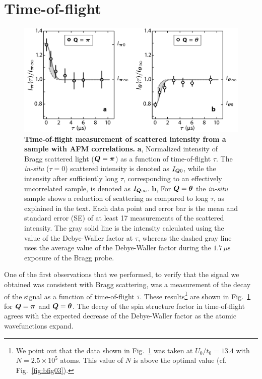 \section{Time-of-flight}
 
\begin{figure}
\centering\includegraphics[width=0.8\columnwidth]{../figures/afmpaper/Hulet_fig2.png}
%
\caption{\textbf{Time-of-flight measurement of scattered intensity from a
sample with AFM correlations.}
\textbf{a}, Normalized intensity of Bragg scattered light
($\bm{Q}=\bm{\pi}$) as a function of time-of-flight $\tau$.  The
\textit{in-situ} ($\tau=0$) scattered intensity is denoted as $I_{\bm{Q}0}$,
while the intensity after sufficiently long $\tau$, corresponding to an
effectively uncorrelated sample, is denoted as $I_{\bm{Q}\infty}$.
\textbf{b}, For $\bm{Q}=\bm{\theta}$  the \textit{in-situ}  sample shows
a reduction of scattering as compared to long $\tau$, as explained in the text.
Each data point and error bar is the mean and standard error (SE) of at least
17 measurements of the scattered intensity.  The gray solid line is the
intensity calculated using the value of the Debye-Waller factor at $\tau$,
whereas the dashed gray line uses the average value of the Debye-Waller factor
during the $1.7\,\mu\text{s}$ exposure of the Bragg probe.}
\label{fig:bfig2}	
\end{figure}

One of the first observations that we performed, to verify that the signal we
obtained was consistent with Bragg scattering, was a measurement of the decay
of the signal as a function of time-of-flight $\tau$.  These
results\footnote{We point out that the data shown in Fig.~\ref{fig:bfig2} was
taken at $U_{0}/t_{0}=13.4$ with $N=2.5\times10^{5}$ atoms. This value of $N$
is above the optimal value (cf. Fig.~\ref{fig:bfig03}).}  are shown in
Fig.~\ref{fig:bfig2} for $\bm{Q}=\bm{\pi}$ and $\bm{Q}=\bm{\theta}$.  The decay
of the spin structure factor in time-of-flight agrees with the expected
decrease of the Debye-Waller factor as the atomic wavefunctions expand.



